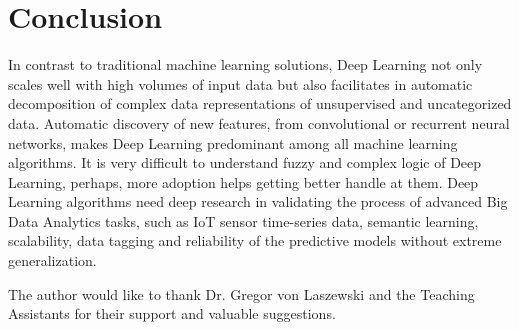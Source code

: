 \documentclass[sigconf]{acmart}
\begin{document}
	\section{Conclusion}		

	In contrast to traditional machine learning solutions, Deep Learning not only scales well with high volumes of input data but also facilitates in automatic decomposition of complex data representations of unsupervised and uncategorized data. Automatic discovery of new features, from convolutional or recurrent neural networks, makes Deep Learning predominant among all machine learning algorithms. It is very difficult to understand fuzzy and complex logic of Deep Learning, perhaps, more adoption helps getting better handle at them. Deep Learning algorithms need deep research in validating the process of advanced Big Data Analytics tasks, such as IoT sensor time-series data, semantic learning, scalability, data tagging and reliability of the predictive models without extreme generalization.  
	
	
	\begin{acks}		
	
		The author would like to thank Dr. Gregor von Laszewski and the Teaching Assistants for their support and valuable suggestions.
		
	\end{acks}

	
	 
	

	
\end{document}
